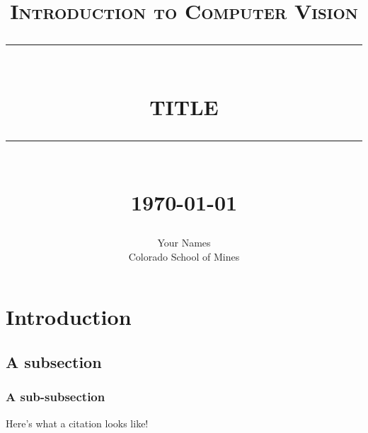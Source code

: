 \documentclass[12pt]{report}
\newcommand{\HRule}[1]{\rule{\linewidth}{#1}}
\begin{document}
\title{ \normalsize \textsc{Introduction to Computer Vision}
		\\ [2.0cm]
		\HRule{0.5pt} \\
		\LARGE \textbf{\uppercase{Title}}
		\HRule{2pt} \\ [0.5cm]
		\normalsize \today \vspace*{5\baselineskip}}

\date{}

\author{
		Your Names \\ 
		Colorado School of Mines \\ }

\maketitle
\newpage

\sectionfont{\scshape}


\section*{Introduction}
\subsection*{A subsection}
\subsubsection*{A sub-subsection}
Here's what a citation looks like!\cite{Smith:2012qr}





\newpage



\end{document}
